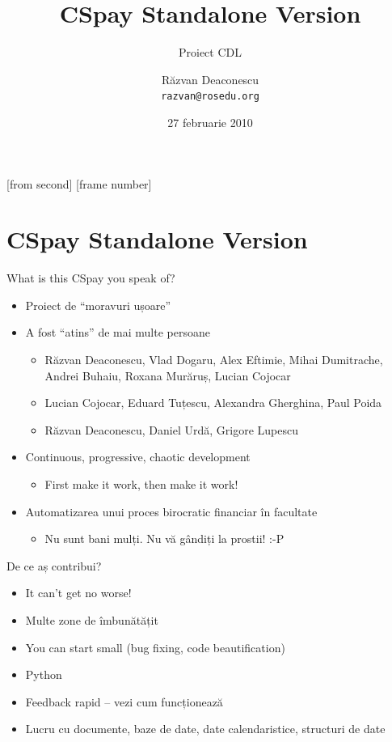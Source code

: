 \documentclass{beamer}
\title[CSpay]{CSpay Standalone Version}
\subtitle{Proiect CDL}
\institute[ROSEdu]{ROSEdu}
\author[Răzvan Deaconescu]{Răzvan Deaconescu \\ \texttt{razvan@rosedu.org}}
\date{27 februarie 2010}
\begin{document}
[from second]
[frame number]

\frame{\titlepage}

\section{CSpay Standalone Version}

\begin{frame}{What is this CSpay you speak of?}
    \begin{itemize}
	\pause \item Proiect de ``moravuri ușoare''
	\pause \item A fost ``atins'' de mai multe persoane
	    \begin{itemize}
		\pause \item Răzvan Deaconescu, Vlad Dogaru, Alex Eftimie, Mihai
Dumitrache, Andrei Buhaiu, Roxana Murăruș, Lucian Cojocar
		\pause \item Lucian Cojocar, Eduard Tuțescu, Alexandra Gherghina,
Paul Poida
		\pause \item Răzvan Deaconescu, Daniel Urdă, Grigore Lupescu
	    \end{itemize}
	\pause \item Continuous, progressive, chaotic development
	    \begin{itemize}
		\pause \item First make it work, then make it work!
	    \end{itemize}
	\pause \item Automatizarea unui proces birocratic financiar în facultate
	    \begin{itemize}
		\pause \item Nu sunt bani mulți. Nu vă gândiți la prostii! :-P
	    \end{itemize}
    \end{itemize}
\end{frame}

\begin{frame}{De ce aș contribui?}
    \begin{itemize}
	\pause \item It can't get no worse!
	\pause \item Multe zone de îmbunătățit
	\pause \item You can start small (bug fixing, code beautification)
	\pause \item Python
	\pause \item Feedback rapid -- vezi cum funcționează
	\pause \item Lucru cu documente, baze de date, date calendaristice, structuri
de date
    \end{itemize}
\end{frame}
\end{document}

